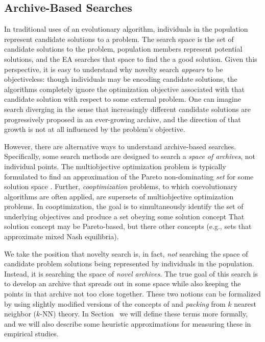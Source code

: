 \documentclass[twoside]{article}
\begin{document}
\subsection{Archive-Based Searches}
\label{subsec:archive}

In traditional uses of an evolutionary algorithm, individuals in the population represent candidate solutions to a problem.  The search space is the set of candidate solutions to the problem, population members represent potential solutions, and the EA searches that space to find the a good solution.  Given this perspective, it is easy to understand why novelty search \emph{appears} to be objectiveless:  though individuals may be encoding candidate solutions, the algorithms completely ignore the optimization objective associated with that candidate solution with respect to some external problem.  One can imagine search diverging in the sense that increasingly different candidate solutions are progressively proposed in an ever-growing archive, and the direction of that growth is not at all influenced by the problem's objective.  

However, there are alternative ways to understand archive-based searches.  Specifically, some search methods are designed to search a \emph{space of archives}, not individual points.  The multiobjective optimization problem is typically formulated to find an approximation of the Pareto non-dominating \emph{set} for some solution space \citep{SeadaDeb2018moo,Zitzler2012}.  
Further, \emph{cooptimization} problems, to which coevolutionary algorithms are often applied, are supersets of multiobjective optimization problems.  In cooptimization, the goal is to simultaneously identify the set of underlying objectives and produce a set obeying some solution concept \citep{FiciciPollack2001ecal,Ficici2008mpsn}
That solution concept may be Pareto-based, but there other concepts (e.g., sets that approximate mixed Nash equilibria).

We take the position that novelty search is, in fact, \emph{not} searching the space of candidate problem solutions being represented by individuals in the population.  Instead, it is searching the space of \emph{novel archives}.  The true goal of this search is to develop an archive that spreads out in some space while also keeping the points in that archive not too close together.  These two notions can be formalized by using slightly modified versions of the concepts of  and \emph{packing} from $k$ nearest neighbor ($k$-NN) theory.  In Section~\pageref{subsec:knn} we will define these terms more formally, and we will also describe some heuristic approximations for measuring these in empirical studies.
\end{document}
